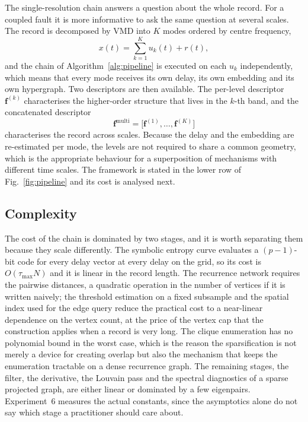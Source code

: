 \documentclass[10pt,a4paper,twocolumn]{article}
\begin{document}
The single-resolution chain answers a question about the whole record.  For a
coupled fault it is more informative to ask the same question at several
scales.  The record is decomposed by VMD into $K$ modes ordered by centre
frequency,
\begin{equation}
x(t) = \sum_{k=1}^{K} u_k(t) + r(t) ,
\label{eq:vmd_sum}
\end{equation}
and the chain of Algorithm~\ref{alg:pipeline} is executed on each $u_k$
independently, which means that every mode receives its own delay, its own
embedding and its own hypergraph.  Two descriptors are then available.  The
per-level descriptor $\mathbf{f}^{(k)}$ characterises the higher-order
structure that lives in the $k$-th band, and the concatenated descriptor
\begin{equation}
\mathbf{f}^{\mathrm{multi}} = \bigl[\mathbf{f}^{(1)}, \dots,
\mathbf{f}^{(K)}\bigr]
\label{eq:multidesc}
\end{equation}
characterises the record across scales.  Because the delay and the embedding
are re-estimated per mode, the levels are not required to share a common
geometry, which is the appropriate behaviour for a superposition of
mechanisms with different time scales.  The framework is stated in the lower
row of Fig.~\ref{fig:pipeline} and its cost is analysed next.

\subsection{Complexity}
\label{sec:complex}

The cost of the chain is dominated by two stages, and it is worth separating
them because they scale differently.  The symbolic entropy curve evaluates a
$(p-1)$-bit code for every delay vector at every delay on the grid, so its
cost is $O(\tau_{\max} N)$ and it is linear in the record length.  The
recurrence network requires the pairwise distances, a quadratic operation in
the number of vertices if it is written naively; the threshold estimation on
a fixed subsample and the spatial index used for the edge query reduce the
practical cost to a near-linear dependence on the vertex count, at the price
of the vertex cap that the construction applies when a record is very long.
The clique enumeration has no polynomial bound in the worst case, which is
the reason the sparsification is not merely a device for creating overlap but
also the mechanism that keeps the enumeration tractable on a dense
recurrence graph.  The remaining stages, the filter, the derivative, the
Louvain pass and the spectral diagnostics of a sparse projected graph, are
either linear or dominated by a few eigenpairs.  Experiment~6 measures the
actual constants, since the asymptotics alone do not say which stage a
practitioner should care about.
\end{document}
